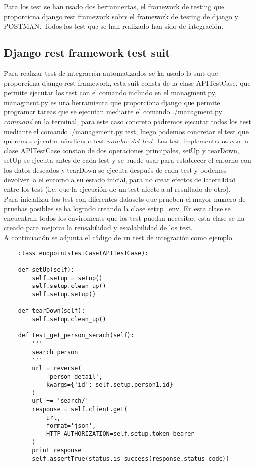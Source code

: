 Para los test se han usado dos herramientas, el framework de testing que proporciona django rest framework sobre el framework de testing de django y POSTMAN. Todos los test que se han realizado han sido de integración.

\subsection{Django rest framework test suit}
\label{drf_test}
Para realizar test de integración automatizados se ha usado la suit que proporciona django rest framework, esta suit consta de la clase APITestCase, que permite ejecutar los test con el comando incluido en el managment.py, managment.py es una herramienta que proporciona django que permite programar tareas que se ejecutan mediante el comando ./managment.py \textit{command} en la terminal, para este caso concreto podremos ejecutar todos los test mediante el comando ./management.py test, luego podemos concretar el test que queremos ejecutar añadiendo test.\textit{nombre del test}. Los test implementados con la clase APITestCase constan de dos operaciones principales, setUp y tearDown, setUp se ejecuta antes de cada test y se puede usar para establecer el entorno con los datos deseados y tearDown se ejecuta después de cada test y podemos devolver la el entorno a su estado inicial, para no crear efectos de lateralidad entre los test (i.e. que la ejecución de un test afecte a al resultado de otro).\\
Para inicializar los test con diferentes datasets que prueben el mayor numero de pruebas posibles se ha logrado creando la clase setup\_env. En esta clase se encuentran todos los enviroments que los test puedan necesitar, esta clase se ha creado para mejorar la reusabilidad y escalabilidad de los test.\\
A continuación se adjunta el código de un test de integración como ejemplo.
\begin{lstlisting}
	class endpointsTestCase(APITestCase):

    def setUp(self):
        self.setup = setup()
        self.setup.clean_up()
        self.setup.setup()

    def tearDown(self):
        self.setup.clean_up()

    def test_get_person_serach(self):
        '''
        search person
        '''
        url = reverse(
            'person-detail',
            kwargs={'id': self.setup.person1.id}
        )
        url += 'search/'
        response = self.client.get(
            url,
            format='json',
            HTTP_AUTHORIZATION=self.setup.token_bearer
        )
        print response
        self.assertTrue(status.is_success(response.status_code))
\end{lstlisting}

